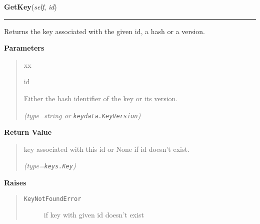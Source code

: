 \hspace{.8\funcindent}\begin{boxedminipage}{\funcwidth}

    \raggedright \textbf{GetKey}(\textit{self}, \textit{id})

    \vspace{-1.5ex}

    \rule{\textwidth}{0.5\fboxrule}
\setlength{\parskip}{2ex}
    Returns the key associated with the given id, a hash or a version.

\setlength{\parskip}{1ex}
      \textbf{Parameters}
      \vspace{-1ex}

      \begin{quote}
        \begin{Ventry}{xx}

          \item[id]

          Either the hash identifier of the key or its version.

            {\it (type=string or \texttt{keydata.KeyVersion})}

        \end{Ventry}

      \end{quote}

      \textbf{Return Value}
    \vspace{-1ex}

      \begin{quote}
      key associated with this id or None if id doesn't exist.

      {\it (type=\texttt{keys.Key})}

      \end{quote}

      \textbf{Raises}
    \vspace{-1ex}

      \begin{quote}
        \begin{description}

          \item[\texttt{KeyNotFoundError}]

          if key with given id doesn't exist

        \end{description}

      \end{quote}

    \end{boxedminipage}

